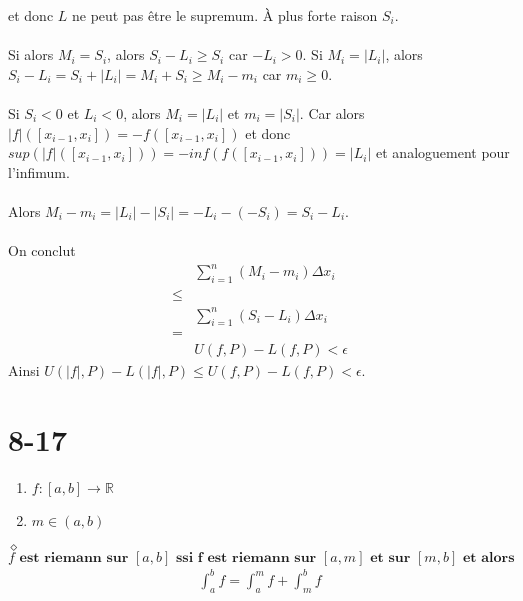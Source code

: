 \documentclass[a4paper,10pt]{article}
\begin{document}
et donc $L$ ne peut pas être le supremum. À plus forte raison $S_i$.
\\
\\
Si alors $M_i = S_i$, alors $S_i - L_i \geq S_i$ car $-L_i > 0$. Si $M_i = |L_i|$, alors
$S_i - L_i = S_i + |L_i| = M_i + S_i \geq M_i - m_i$ car $m_i \geq 0$.
\\
\\
Si $S_i < 0$ et $L_i < 0$, alors $M_i = |L_i|$ et $m_i = |S_i|$. Car alors $|f|([x_{i-1}, x_i]) = -f([x_{i-1}, x_i])$ et donc
$sup(|f|([x_{i-1}, x_i])) = -inf(f([x_{i-1}, x_i])) = |L_i|$ et analoguement pour l'infimum.
\\
\\
Alors $M_i - m_i = |L_i| - |S_i| = -L_i - (-S_i) = S_i - L_i$.
\\
\\
On conclut 
\begin{align*}
 & \sum_{i = 1}^n (M_i - m_i) \Delta x_i \\
 \leq \\
 & \sum_{i = 1}^n (S_i - L_i) \Delta x_i \\
 = \\
 & U(f,P) - L(f,P) < \epsilon
\end{align*}
Ainsi $U(|f|,P) - L(|f|,P) \leq U(f,P) - L(f,P) < \epsilon$.

\section*{8-17}
\begin{enumerate}
 \item $f : [a,b] \rightarrow \mathbb{R}$
 \item $m \in (a,b)$
\end{enumerate}
$\diamond$ $f \textbf{ est riemann sur } [a,b] \textbf{ ssi f est riemann sur } [a,m] \textbf{ et sur } [m,b] \textbf{ et alors }$
\begin{align*}
 \int_a^b f = \int_a^m f + \int_m^b f
\end{align*}
\end{document}
